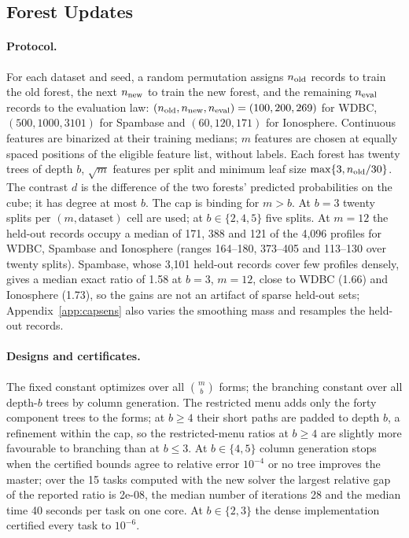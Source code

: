 \subsection{Forest Updates}\label{app:forestexact}
\paragraph{Protocol.}
For each dataset and seed, a random permutation assigns $n_{\rm old}$ records to train the old forest, the next $n_{\rm new}$ to train the new forest, and the remaining $n_{\rm eval}$ records to the evaluation law: $(n_{\rm old},n_{\rm new},n_{\rm eval})=(100,200,269)$ for WDBC, $(500,1000,3101)$ for Spambase and $(60,120,171)$ for Ionosphere. Continuous features are binarized at their training medians; $m$ features are chosen at equally spaced positions of the eligible feature list, without labels. Each forest has twenty trees of depth $b$, $\sqrt m$ features per split and minimum leaf size $\max\{3,n_{\rm old}/30\}$. The contrast $d$ is the difference of the two forests' predicted probabilities on the cube; it has degree at most $b$. The cap is binding for $m>b$. At $b=3$ twenty splits per $(m,\text{dataset})$ cell are used; at $b\in\{2,4,5\}$ five splits. At $m=12$ the held-out records occupy a median of 171, 388 and 121 of the 4,096 profiles for WDBC, Spambase and Ionosphere (ranges 164--180, 373--405 and 113--130 over twenty splits). Spambase, whose 3,101 held-out records cover few profiles densely, gives a median exact ratio of 1.58 at $b=3$, $m=12$, close to WDBC (1.66) and Ionosphere (1.73), so the gains are not an artifact of sparse held-out sets; Appendix~\ref{app:capsens} also varies the smoothing mass and resamples the held-out records.

\paragraph{Designs and certificates.}
The fixed constant optimizes over all $\binom mb$ forms; the branching constant over all depth-$b$ trees by column generation. The restricted menu adds only the forty component trees to the forms; at $b\ge4$ their short paths are padded to depth $b$, a refinement within the cap, so the restricted-menu ratios at $b\ge4$ are slightly more favourable to branching than at $b\le3$. At $b\in\{4,5\}$ column generation stops when the certified bounds agree to relative error $10^{-4}$ or no tree improves the master; over the 15 tasks computed with the new solver the largest relative gap of the reported ratio is 2e-08, the median number of iterations 28 and the median time 40 seconds per task on one core. At $b\in\{2,3\}$ the dense implementation certified every task to $10^{-6}$.

